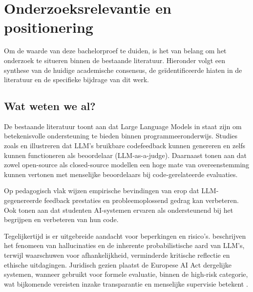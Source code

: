 
\section{Onderzoeksrelevantie en positionering}
\label{ch:onderzoeksrelevantie-positionering}

Om de waarde van deze bachelorproef te duiden, is het van belang om het onderzoek te situeren binnen de bestaande literatuur. Hieronder volgt een synthese van de huidige academische consensus, de geïdentificeerde hiaten in de literatuur en de specifieke bijdrage van dit werk.

\subsection{Wat weten we al?}

De bestaande literatuur toont aan dat Large Language Models in staat zijn om betekenisvolle ondersteuning te bieden binnen programmeeronderwijs. Studies zoals \textcite{Sarsa2022} en \textcite{Koutcheme2025} illustreren dat LLM’s bruikbare codefeedback kunnen genereren en zelfs kunnen functioneren als beoordelaar (LLM-as-a-judge). Daarnaast tonen \textcite{Mendonca2025} aan dat zowel open-source als closed-source modellen een hoge mate van overeenstemming kunnen vertonen met menselijke beoordelaars bij code-gerelateerde evaluaties.

\vspace{1em}

Op pedagogisch vlak wijzen empirische bevindingen van \textcite{Zhou2025} erop dat LLM-gegenereerde feedback prestaties en probleemoplossend gedrag kan verbeteren. Ook \textcite{Lepp2025} tonen aan dat studenten AI-systemen ervaren als ondersteunend bij het begrijpen en verbeteren van hun code.

\vspace{1em}

Tegelijkertijd is er uitgebreide aandacht voor beperkingen en risico’s. \textcite{Ye2023} beschrijven het fenomeen van hallucinaties en de inherente probabilistische aard van LLM’s, terwijl \textcite{Kasneci2023} waarschuwen voor afhankelijkheid, verminderde kritische reflectie en ethische uitdagingen. Juridisch gezien plaatst de Europese AI Act dergelijke systemen, wanneer gebruikt voor formele evaluatie, binnen de high-risk categorie, wat bijkomende vereisten inzake transparantie en menselijke supervisie betekent \autocite{EU2024AIAct}.

